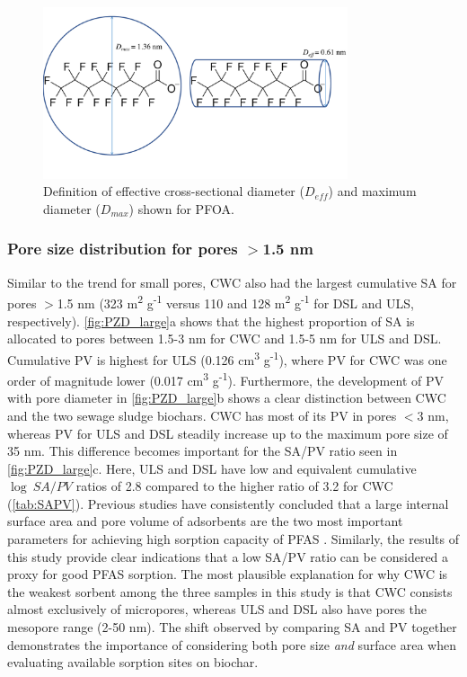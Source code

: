 \begin{figure}
    \centering
    \includegraphics[width=0.8\textwidth, trim={0 2cm 0 0},clip]{Diagrams/Molecular_size.pdf}
    \caption{Definition of effective cross-sectional diameter ($D_{eff}$) and maximum diameter ($D_{max}$) shown for PFOA.}
    \label{fig:molecularSize}
\end{figure}

\subsubsection{Pore size distribution for pores $>$1.5 nm}
Similar to the trend for small pores, CWC also had the largest cumulative SA for pores $>$1.5 nm (323 m\textsuperscript{2} g\textsuperscript{-1} versus 110 and 128 m\textsuperscript{2} g\textsuperscript{-1} for DSL and ULS, respectively). \cref{fig:PZD_large}a shows that the highest proportion of SA is allocated to pores between 1.5-3 nm for CWC and 1.5-5 nm for ULS and DSL. Cumulative PV is highest for ULS (0.126 cm\textsuperscript{3} g\textsuperscript{-1}), where PV for CWC was one order of magnitude lower (0.017 cm\textsuperscript{3} g\textsuperscript{-1}). Furthermore, the development of PV with pore diameter in \cref{fig:PZD_large}b shows a clear distinction between CWC and the two sewage sludge biochars. CWC has most of its PV in pores $<$3 nm, whereas PV for ULS and DSL steadily increase up to the maximum pore size of 35 nm. This difference becomes important for the SA/PV ratio seen in \cref{fig:PZD_large}c. Here, ULS and DSL have low and equivalent cumulative $\log~SA/PV$ ratios of 2.8 compared to the higher ratio of 3.2 for CWC (\cref{tab:SAPV}). Previous studies have consistently concluded that a large internal surface area and pore volume of adsorbents are the two most important parameters for achieving high sorption capacity of PFAS \citep{du2014adsorption,Sormo2021,Hale2016,ahmed2020per}. Similarly, the results of this study provide clear indications that a low SA/PV ratio can be considered a proxy for good PFAS sorption. The most plausible explanation for why CWC is the weakest sorbent among the three samples in this study is that CWC consists almost exclusively of micropores, whereas ULS and DSL also have pores the mesopore range (2-50 nm). The shift observed by comparing SA and PV together demonstrates the importance of considering both pore size \textit{and} surface area when evaluating available sorption sites on biochar.

